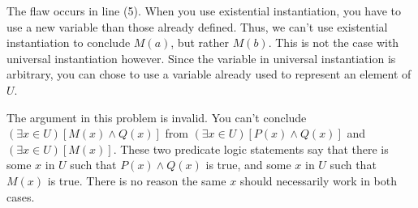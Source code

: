 \documentclass{article}
\theoremstyle{definition}
\begin{document}
	The flaw occurs in line (5). When you use existential
	instantiation, you have to use a new variable than those already
	defined. Thus, we can't use existential instantiation to conclude
	$M(a)$, but rather $M(b)$. This is not the case with universal
	instantiation however. Since the variable in universal
	instantiation is arbitrary, you can chose to use a variable already
	used to represent an element of $U$.

	The argument in this problem is invalid. You can't conclude
	$(\exists x \in U)[M(x)\wedge Q(x)]$ from $(\exists x \in
	U)[P(x)\wedge Q(x)]$ and $(\exists x \in U)[M(x)]$. These two
	predicate logic statements say that there is some $x$ in $U$ such
	that $P(x)\wedge Q(x)$ is true, and some $x$ in $U$ such that $M(x)$
	is true. There is no reason the same $x$ should necessarily work in
	both cases.

	\vspace{0.6cm}
\end{document}
